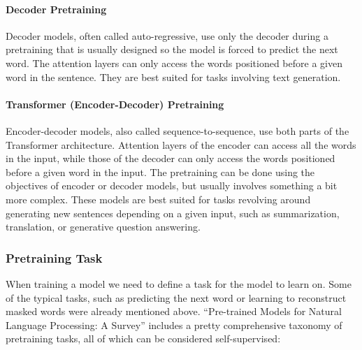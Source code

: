 \documentclass{article}
\begin{document}
\paragraph{Decoder Pretraining}

Decoder models, often called auto-regressive, use only the decoder during a pretraining that is usually designed so the model is forced to predict the next word. The attention layers can only access the words positioned before a given word in the sentence. They are best suited for tasks involving text generation.

\paragraph{Transformer (Encoder-Decoder) Pretraining}

Encoder-decoder models, also called sequence-to-sequence, use both parts of the Transformer architecture. Attention layers of the encoder can access all the words in the input, while those of the decoder can only access the words positioned before a given word in the input. The pretraining can be done using the objectives of encoder or decoder models, but usually involves something a bit more complex. These models are best suited for tasks revolving around generating new sentences depending on a given input, such as summarization, translation, or generative question answering.

\subsubsection{Pretraining Task}

When training a model we need to define a task for the model to learn on. Some of the typical tasks, such as predicting the next word or learning to reconstruct masked words were already mentioned above. “Pre-trained Models for Natural Language Processing: A Survey”\cite{qiu2020pre} includes a pretty comprehensive taxonomy of pretraining tasks, all of which can be considered self-supervised:
\end{document}
